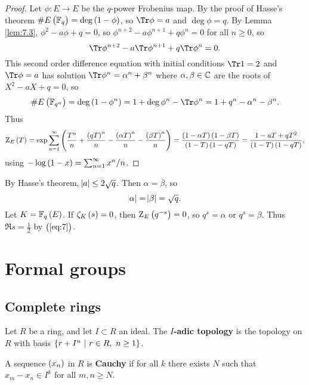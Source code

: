 \begin{proof}
Let $ \phi : E \to E $ be the $ q $-power Frobenius map. By the proof of Hasse's theorem $ \#E\br{\FF_q} = \deg \br{1 - \phi} $, so $ \Tr \phi = a $ and $ \deg \phi = q $. By Lemma \ref{lem:7.3}, $ \phi^2 - a\phi + q = 0 $, so $ \phi^{n + 2} - a\phi^{n + 1} + q\phi^n = 0 $ for all $ n \ge 0 $, so
$$ \Tr \phi^{n + 2} - a\Tr \phi^{n + 1} + q\Tr \phi^n = 0. $$
This second order difference equation with initial conditions $ \Tr 1 = 2 $ and $ \Tr \phi = a $ has solution $ \Tr \phi^n = \alpha^n + \beta^n $ where $ \alpha, \beta \in \mathbb{C} $ are the roots of $ X^2 - aX + q = 0 $, so
$$ \#E\br{\FF_{q^n}} = \deg \br{1 - \phi^n} = 1 + \deg \phi^n - \Tr \phi^n = 1 + q^n - \alpha^n - \beta^n. $$
Thus
$$ \Z_E\br{T} = \exp \sum_{n = 1}^\infty \br{\dfrac{T^n}{n} + \dfrac{\br{qT}^n}{n} - \dfrac{\br{\alpha T}^n}{n} - \dfrac{\br{\beta T}^n}{n}} = \dfrac{\br{1 - \alpha T}\br{1 - \beta T}}{\br{1 - T}\br{1 - qT}} = \dfrac{1 - aT + qT^2}{\br{1 - T}\br{1 - qT}}, $$
using $ -\log \br{1 - x} = \sum_{n = 1}^\infty x^n / n $.
\end{proof}

\begin{remark*}
By Hasse's theorem, $ \abs{a} \le 2\sqrt{q} $. Then $ \alpha = \overline{\beta} $, so
\begin{equation}
\label{eq:7}
\abs{\alpha} = \abs{\beta} = \sqrt{q}.
\end{equation}
Let $ K = \FF_q\br{E} $. If $ \zeta_K\br{s} = 0 $, then $ \Z_E\br{q^{-s}} = 0 $, so $ q^s = \alpha $ or $ q^s = \beta $. Thus $ \Re s = \tfrac{1}{2} $ by $ \br{\ref{eq:7}} $.
\end{remark*}

\pagebreak

\section{Formal groups}

\subsection{Complete rings}

\begin{definition*}
Let $ R $ be a ring, and let $ I \subset R $ an ideal. The \textbf{$ I $-adic topology} is the topology on $ R $ with basis $ \cbr{r + I^n \st r \in R, \ n \ge 1} $.
\end{definition*}

\begin{definition*}
A sequence $ \br{x_n} $ in $ R $ is \textbf{Cauchy} if for all $ k $ there exists $ N $ such that $ x_m - x_n \in I^k $ for all $ m, n \ge N $.
\end{definition*}

